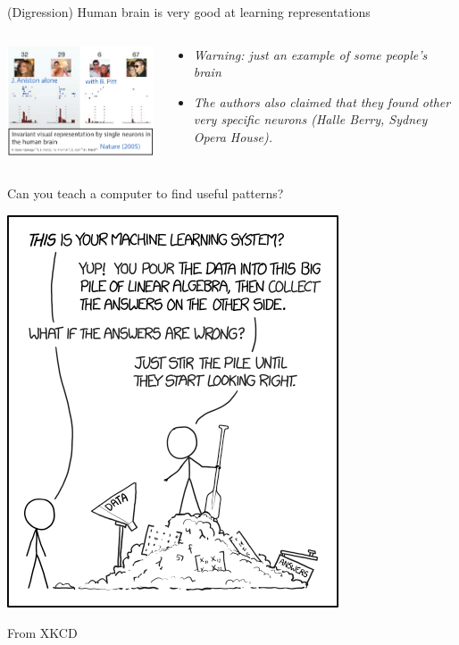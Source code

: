 \documentclass[
  ignorenonframetext,
  aspectratio=169]{beamer}
\begin{document}
\begin{frame}{(Digression) Human brain is very good at learning
representations}
\protect\hypertarget{digression-human-brain-is-very-good-at-learning-representations}{}
\begin{columns}[T]
\begin{column}{.65\textwidth}
\scriptsize

\begin{center}\includegraphics[width=.8\linewidth]{./Vis/unsupervised/neuron_firing_celebrity} \end{center}

\normalsize
\end{column}

\begin{column}{.3\textwidth}
\begin{itemize}
\item
  \emph{Warning: just an example of some people's brain}
\item
  \emph{The authors also claimed that they found other very specific
  neurons (Halle Berry, Sydney Opera House).}
\end{itemize}
\end{column}
\end{columns}
\end{frame}

\begin{frame}{Can you teach a computer to find useful patterns?}
\protect\hypertarget{can-you-teach-a-computer-to-find-useful-patterns}{}
\scriptsize

\begin{center}\includegraphics[width=.35\linewidth]{Vis/unsupervised/machine_learning} \end{center}

\normalsize

\tiny

From XKCD
\end{frame}
\end{document}
